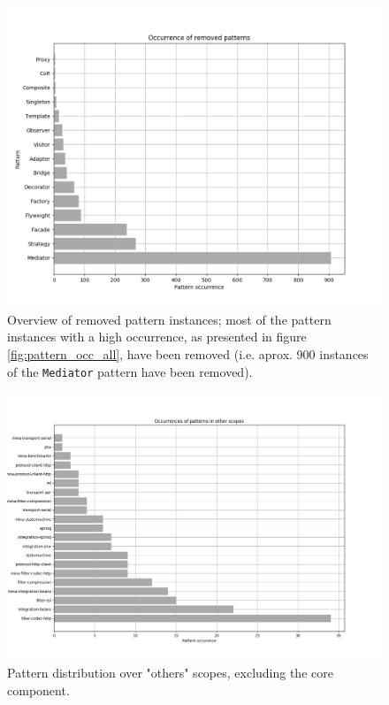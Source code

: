\begin{figure}[H]
    \centering
    \includegraphics[width = \textwidth]{images/graphs/pattern_occurrence_removed.png}
    \caption{Overview of removed pattern instances; most of the pattern instances with a high occurrence, as presented in figure \ref{fig:pattern_occ_all}, have been removed (i.e. aprox. 900 instances of the \texttt{Mediator} pattern have been removed).}
    \label{fig:pattern_occ_removed}  
\end{figure}

\begin{figure}[H]
    \centering
    \includegraphics[width = \textwidth]{images/graphs/other_scopes.png}
    \caption{Pattern distribution over "others" scopes, excluding the core component.}
    \label{fig:others_scope_percentages}
\end{figure}

